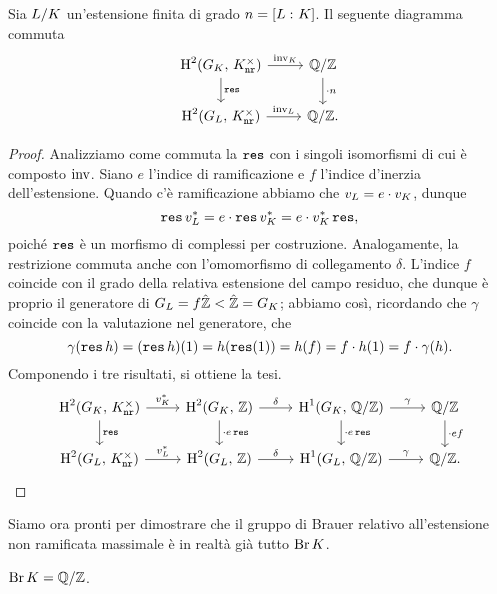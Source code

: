 \begin{proposition}
	Sia $ L/K $ un'estensione finita di grado $ n = [L\, \colon K] $. Il seguente diagramma commuta
	\[ \begin{tikzcd}
	\HH^2(G_\K, \, \knr^\times) \rar["\inv_\K"] \dar["\Res"]
	& \Q/\Z \dar["\cdot n"] \\
	\HH^2(G_L, \, \knr^\times) \rar["\inv_L"]
	& \Q/\Z.
	\end{tikzcd} \]
\end{proposition}
\begin{proof}
	Analizziamo come commuta la $ \operatorname{\mathtt{res}} $ con i singoli isomorfismi di cui è composto $ \operatorname{inv} $. Siano $ e $ l'indice di ramificazione e $ f $ l'indice d'inerzia dell'estensione. Quando c'è ramificazione abbiamo che $ v_L = e \cdot v_K $, dunque
	\[ \operatorname{\mathtt{res}} v_L^* = e \cdot \operatorname{\mathtt{res}} v_K^* = e \cdot v_K^* \operatorname{\mathtt{res}}, \]
	poiché $ \operatorname{\mathtt{res}} $ è un morfismo di complessi per costruzione. 
	Analogamente, la restrizione commuta anche con l'omomorfismo di collegamento $ \delta $. L'indice $ f $ coincide con il grado della relativa estensione del campo residuo, che dunque è proprio il generatore di $ G_L = f\hat{\mathbb{Z}} < \hat{\mathbb{Z}} = G_K $; abbiamo così, ricordando che $ \gamma $ coincide con la valutazione nel generatore, che
	$$  \gamma(\operatorname{\mathtt{res}} h) = (\operatorname{\mathtt{res}} h)(1) = h(\operatorname{\mathtt{res}}(1)) = h(f) = f\cdot h(1) = f \cdot  \gamma(h).  $$
	Componendo i tre risultati, si ottiene la tesi.
	\[ \begin{tikzcd}
	\HH^2(G_\K, \, \knr^\times) \rar["v_\K^*"] \dar["\Res"]
	& \HH^2(G_\K, \, \Z) \dar["\cdot e\Res"] \rar["\delta"]
	& \HH^1(G_\K, \, \Q/\Z) \rar["\gamma"] \dar["\cdot e\Res"]
	& \Q/\Z \dar["\cdot ef"] \\
	\HH^2(G_L, \, \knr^\times) \rar["v_L^*"]
	& \HH^2(G_L, \, \Z) \rar["\delta"]
	& \HH^1(G_L, \, \Q/\Z) \rar["\gamma"]
	& \Q/\Z.
	\end{tikzcd} \]
\end{proof}

Siamo ora pronti per dimostrare che il gruppo di Brauer relativo all'estensione non ramificata massimale è in realtà già tutto $ \operatorname{Br} K $.

\begin{theorem}
	$ \operatorname{Br} K = \mathbb{Q}/\mathbb{Z} $.
\end{theorem}

